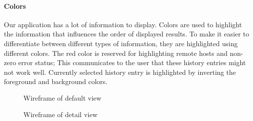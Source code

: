 \paragraph{Colors}

Our application has a lot of information to display. 
Colors are used to highlight the information that influences the order of displayed results. To make it easier to differentiate between different types of information, they are highlighted using different colors. 
The red color is reserved for highlighting remote hosts and non-zero error status; This communicates to the user that these history entries might not work well.
Currently selected history entry is highlighted by inverting the foreground and background colors.


\begin{figure}[h!]
\caption{Wireframe of default view}
\label{wireframe-normal}
\end{figure}

\begin{figure}[h!]
\caption{Wireframe of detail view}
\label{wireframe-detail}
\end{figure}


